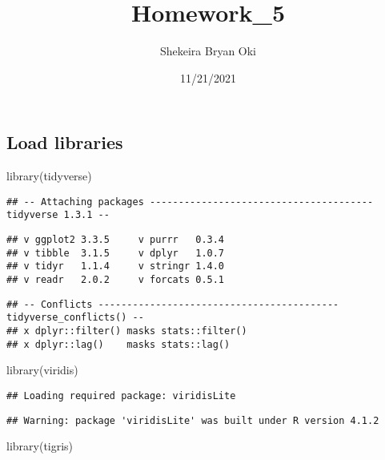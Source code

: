 \documentclass[
]{article}
\title{Homework\_5}
\author{Shekeira Bryan Oki}
\date{11/21/2021}
\newenvironment{Shaded}{\begin{snugshade}}{\end{snugshade}}
\newcommand{\FunctionTok}[1]{\textcolor[rgb]{0.00,0.00,0.00}{#1}}
\newcommand{\NormalTok}[1]{#1}
\begin{document}
\maketitle

\hypertarget{load-libraries}{%
\subsection{Load libraries}\label{load-libraries}}

\begin{Shaded}
\begin{Highlighting}[]
\FunctionTok{library}\NormalTok{(tidyverse)}
\end{Highlighting}
\end{Shaded}

\begin{verbatim}
## -- Attaching packages --------------------------------------- tidyverse 1.3.1 --
\end{verbatim}

\begin{verbatim}
## v ggplot2 3.3.5     v purrr   0.3.4
## v tibble  3.1.5     v dplyr   1.0.7
## v tidyr   1.1.4     v stringr 1.4.0
## v readr   2.0.2     v forcats 0.5.1
\end{verbatim}

\begin{verbatim}
## -- Conflicts ------------------------------------------ tidyverse_conflicts() --
## x dplyr::filter() masks stats::filter()
## x dplyr::lag()    masks stats::lag()
\end{verbatim}

\begin{Shaded}
\begin{Highlighting}[]
\FunctionTok{library}\NormalTok{(viridis)}
\end{Highlighting}
\end{Shaded}

\begin{verbatim}
## Loading required package: viridisLite
\end{verbatim}

\begin{verbatim}
## Warning: package 'viridisLite' was built under R version 4.1.2
\end{verbatim}

\begin{Shaded}
\begin{Highlighting}[]
\FunctionTok{library}\NormalTok{(tigris)}
\end{Highlighting}
\end{Shaded}
\end{document}
